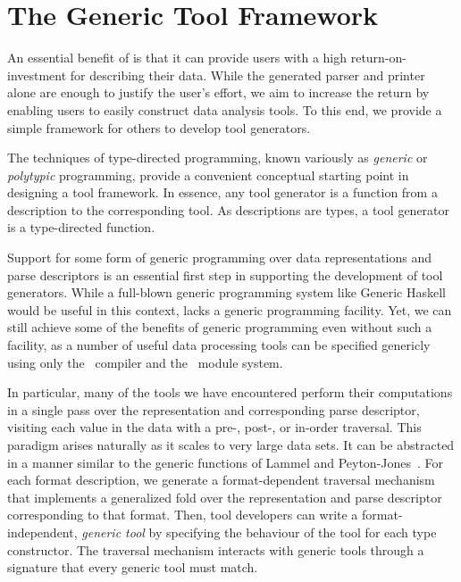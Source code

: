 \section{The Generic Tool Framework}
\label{sec:gen-tool}

An essential benefit of \padsml{} is that it can provide users with a
high return-on-investment for describing their data. While the
generated parser and printer alone are enough to justify the user's
effort, we aim to increase the return by enabling users to easily
construct data analysis tools.
To this end, we provide a simple framework for others to develop tool
generators.

The techniques of type-directed programming, known variously as
\textit{generic} or \textit{polytypic} programming, provide a
convenient conceptual starting point in designing a tool framework.
In essence, any tool generator is a function from a description to the
corresponding tool. As \padsml{} descriptions are types, a tool
generator is a type-directed function.

Support for some form of generic programming over data representations
and parse descriptors is an essential first step in supporting the
development of tool generators. While a full-blown generic programming
system like Generic Haskell~\cite{hinze+:generic-haskell} would be
useful in this context, \ocaml{} lacks a generic programming facility.
Yet, we can still achieve some of the benefits of generic programming
even without such a facility, as a number of useful data processing
tools can be specified genericly using only the \padsml\ compiler and
the \ocaml\ module system. 

In particular, many of the tools we have encountered 
perform their computations in a single pass over the representation
and corresponding parse descriptor, visiting each value in the data
with a pre-, post-, or in-order traversal.  This paradigm arises naturally
as it scales to very large data sets. It can be
abstracted in a manner similar to the generic functions of Lammel and
Peyton-Jones~\cite{lammel+:syb}. For each format description, we generate a
format-dependent traversal mechanism that implements a generalized
fold over the representation and parse descriptor corresponding to
that format. Then, tool developers can write a format-independent,
\emph{generic tool} by specifying the behaviour of the tool for each
\padsml{} type constructor. The traversal mechanism interacts with
generic tools through a signature that every generic tool must match.

